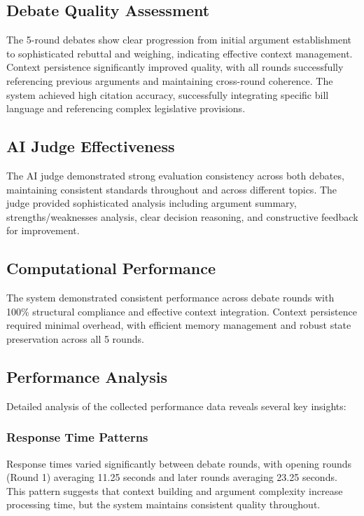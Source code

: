 \documentclass{article}
\begin{document}
\subsection{Debate Quality Assessment}

The 5-round debates show clear progression from initial argument establishment to sophisticated rebuttal and weighing, indicating effective context management. Context persistence significantly improved quality, with all rounds successfully referencing previous arguments and maintaining cross-round coherence. The system achieved high citation accuracy, successfully integrating specific bill language and referencing complex legislative provisions.

\subsection{AI Judge Effectiveness}

The AI judge demonstrated strong evaluation consistency across both debates, maintaining consistent standards throughout and across different topics. The judge provided sophisticated analysis including argument summary, strengths/weaknesses analysis, clear decision reasoning, and constructive feedback for improvement.

\subsection{Computational Performance}

The system demonstrated consistent performance across debate rounds with 100\% structural compliance and effective context integration. Context persistence required minimal overhead, with efficient memory management and robust state preservation across all 5 rounds.

\subsection{Performance Analysis}

Detailed analysis of the collected performance data reveals several key insights:

\subsubsection{Response Time Patterns}
Response times varied significantly between debate rounds, with opening rounds (Round 1) averaging 11.25 seconds and later rounds averaging 23.25 seconds. This pattern suggests that context building and argument complexity increase processing time, but the system maintains consistent quality throughout.
\end{document}
